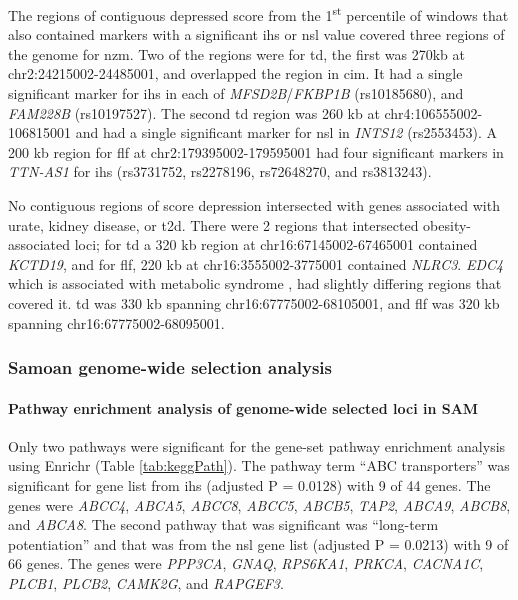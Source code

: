 \documentclass[]{report}
\let\oldparagraph\paragraph
\renewcommand{\paragraph}[1]{\oldparagraph{#1}\mbox{}}
\begin{document}
The regions of contiguous depressed score from the 1\textsuperscript{st}
percentile of windows that also contained markers with a significant
\gls{ihs} or \gls{nsl} value covered three regions of the genome for
\gls{nzm}. Two of the regions were for \gls{td}, the first was 270kb at
chr2:24215002-24485001, and overlapped the region in \gls{cim}. It had a
single significant marker for \gls{ihs} in each of
\emph{MFSD2B}/\emph{FKBP1B} (rs10185680), and \emph{FAM228B}
(rs10197527). The second \gls{td} region was 260 kb at
chr4:106555002-106815001 and had a single significant marker for
\gls{nsl} in \emph{INTS12} (rs2553453). A 200 kb region for \gls{flf} at
chr2:179395002-179595001 had four significant markers in \emph{TTN-AS1}
for \gls{ihs} (rs3731752, rs2278196, rs72648270, and rs3813243).

No contiguous regions of score depression intersected with genes
associated with urate, kidney disease, or \gls{t2d}. There were 2
regions that intersected obesity-associated loci; for \gls{td} a 320 kb
region at chr16:67145002-67465001 contained \emph{KCTD19}, and for
\gls{flf}, 220 kb at chr16:3555002-3775001 contained \emph{NLRC3}.
\emph{EDC4} which is associated with metabolic syndrome
\citep{kristiansson2012genome}, had slightly differing regions that
covered it. \Gls{td} was 330 kb spanning chr16:67775002-68105001, and
\gls{flf} was 320 kb spanning chr16:67775002-68095001.

\subsubsection{Samoan genome-wide selection
analysis}\label{samoan-genome-wide-selection-analysis}

\paragraph{Pathway enrichment analysis of genome-wide selected loci in
SAM}\label{samPath}

Only two pathways were significant for the gene-set pathway enrichment
analysis using Enrichr (Table \ref{tab:keggPath}). The pathway term
``ABC transporters'' was significant for gene list from \gls{ihs}
(adjusted P = 0.0128) with 9 of 44 genes. The genes were \emph{ABCC4},
\emph{ABCA5}, \emph{ABCC8}, \emph{ABCC5}, \emph{ABCB5}, \emph{TAP2},
\emph{ABCA9}, \emph{ABCB8}, and \emph{ABCA8}. The second pathway that
was significant was ``long-term potentiation'' and that was from the
\gls{nsl} gene list (adjusted P = 0.0213) with 9 of 66 genes. The genes
were \emph{PPP3CA}, \emph{GNAQ}, \emph{RPS6KA1}, \emph{PRKCA},
\emph{CACNA1C}, \emph{PLCB1}, \emph{PLCB2}, \emph{CAMK2G}, and
\emph{RAPGEF3}.
\end{document}
